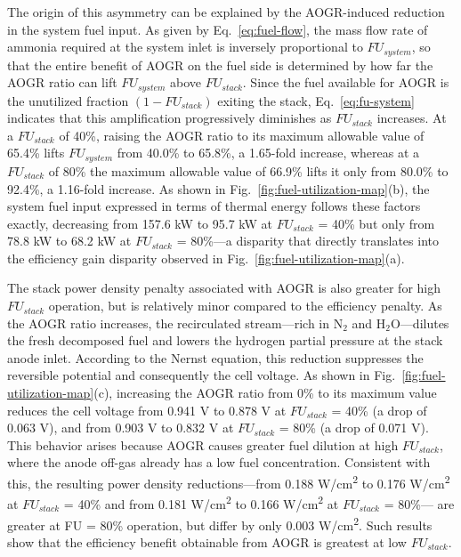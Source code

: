 \documentclass[a4paper,10pt]{cas-dc} %
\begin{document}
The origin of this asymmetry can be explained by the AOGR-induced reduction in the system fuel input.
As given by Eq.~\eqref{eq:fuel-flow}, the mass flow rate of ammonia required at the system inlet is inversely proportional to \({FU}_{system}\), so that the entire benefit of AOGR on the fuel side is determined by how far the AOGR ratio can lift \({FU}_{system}\) above \({FU}_{stack}\).
Since the fuel available for AOGR is the unutilized fraction \(\left( 1-FU_{stack} \right)\) exiting the stack, Eq.~\eqref{eq:fu-system} indicates that this amplification progressively diminishes as \({FU}_{stack}\) increases.
At a \({FU}_{stack}\) of 40\%, raising the AOGR ratio to its maximum allowable value of 65.4\% lifts \({FU}_{system}\) from 40.0\% to 65.8\%, a 1.65-fold increase, whereas at a \({FU}_{stack}\) of 80\% the maximum allowable value of 66.9\% lifts it only from 80.0\% to 92.4\%, a 1.16-fold increase.
As shown in Fig.~\ref{fig:fuel-utilization-map}(b), the system fuel input expressed in terms of thermal energy follows these factors exactly, decreasing from 157.6 kW to 95.7 kW at \({FU}_{stack}\) = 40\% but only from 78.8 kW to 68.2 kW at \({FU}_{stack}\) = 80\%---a disparity that directly translates into the efficiency gain disparity observed in Fig.~\ref{fig:fuel-utilization-map}(a).

The stack power density penalty associated with AOGR is also greater for high \({FU}_{stack}\) operation, but is relatively minor compared to the efficiency penalty.
As the AOGR ratio increases, the recirculated stream---rich in N$_2$ and H$_2$O---dilutes the fresh decomposed fuel and lowers the hydrogen partial pressure at the stack anode inlet.
According to the Nernst equation, this reduction suppresses the reversible potential and consequently the cell voltage.
As shown in Fig.~\ref{fig:fuel-utilization-map}(c), increasing the AOGR ratio from 0\% to its maximum value reduces the cell voltage from 0.941 V to 0.878 V at \({FU}_{stack}\) = 40\% (a drop of 0.063 V), and from 0.903 V to 0.832 V at \({FU}_{stack}\) = 80\% (a drop of 0.071 V).
This behavior arises because AOGR causes greater fuel dilution at high \({FU}_{stack}\), where the anode off-gas already has a low fuel concentration.
Consistent with this, the resulting power density reductions---from 0.188 W/cm\textsuperscript{2} to 0.176 W/cm\textsuperscript{2} at \({FU}_{stack}\) = 40\% and from 0.181 W/cm\textsuperscript{2} to 0.166 W/cm\textsuperscript{2} at \({FU}_{stack}\) = 80\%--- are greater at FU = 80\% operation, but differ by only 0.003 W/cm\textsuperscript{2}.
Such results show that the efficiency benefit obtainable from AOGR is greatest at low \({FU}_{stack}\).
\end{document}

